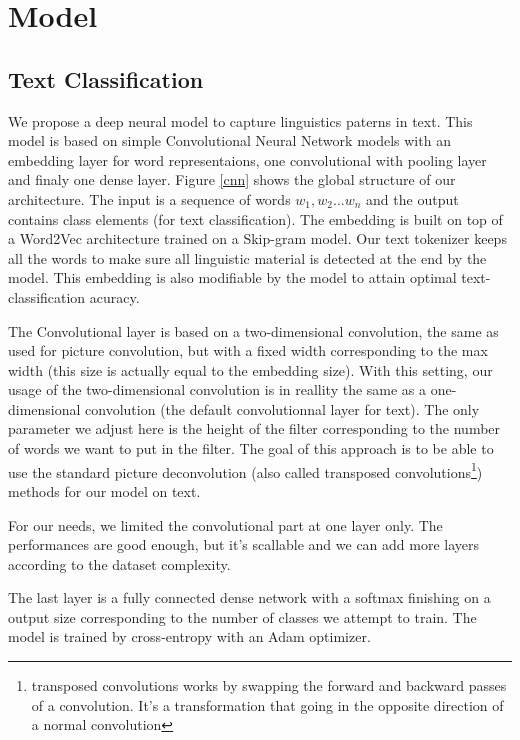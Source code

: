 \section{Model}
\label{sec:model}

\subsection{Text Classification}

We propose a deep neural model to capture linguistics paterns in text. This model is based on simple Convolutional Neural Network models with an embedding layer for word representaions, one convolutional with pooling layer and finaly one dense layer. Figure \ref{cnn} shows the global structure of our architecture. The input is a sequence of words $ w_{1}, w_{2} ... w_{n} $ and the output contains class elements (for text classification). The embedding is built on top of a Word2Vec architecture trained on a Skip-gram model. Our text tokenizer keeps all the words to make sure all linguistic material is detected at the end by the model. This embedding is also modifiable by the model to attain optimal text-classification acuracy. 

The Convolutional layer is based on a two-dimensional convolution, the same as used for picture convolution, but with a fixed width corresponding to the max width (this size is actually equal to the embedding size). With this setting, our usage of the two-dimensional convolution is in reallity the same as a one-dimensional convolution (the default convolutionnal layer for text). The only parameter we adjust here is the height of the filter corresponding to the number of words we want to put in the filter. The goal of this approach is to be able to use the standard picture deconvolution (also called transposed convolutions\footnote{transposed convolutions works by swapping the forward and backward passes of a convolution. It's a transformation that going in the opposite direction of a normal convolution}) methods for our model on text.

For our needs, we limited the convolutional part at one layer only. The performances are good enough, but it's scallable and we can add more layers according to the dataset complexity.

The last layer is a fully connected dense network with a softmax finishing on a output size corresponding to the number of classes we attempt to train. The model is trained by cross-entropy with an Adam optimizer.

